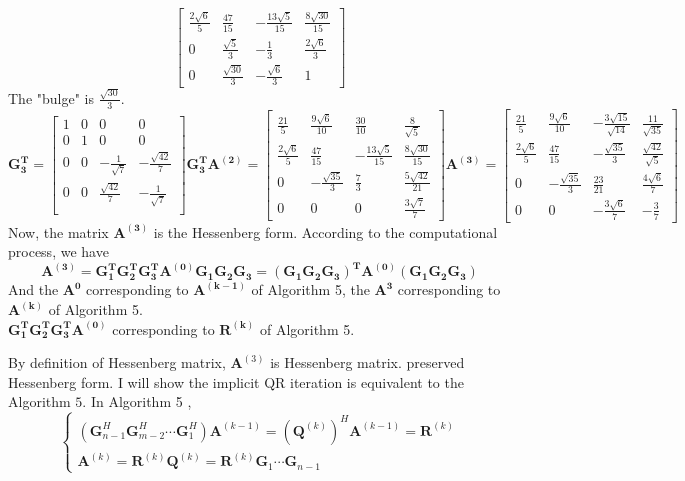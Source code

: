 \documentclass[english,onecolumn]{IEEEtran}
\begin{document}
\begin{enumerate}
$$\begin{bmatrix}
    	\frac{2\sqrt{6}}{5} &\frac{47}{15} &-\frac{13\sqrt{5}}{15} & \frac{8\sqrt{30}}{15}\\
    	0 & \frac{\sqrt{5}}{3} &-\frac{1}{3}&\frac{2\sqrt{6}}{3} \\
    	0 & \frac{\sqrt{30}}{3}& -\frac{\sqrt{6}}{3} & 1
    \end{bmatrix}
    $$
    The "bulge" is $\frac{\sqrt{30}}{3}$.
    $$\mathbf{G_3^T}=\begin{bmatrix}
    	1 & 0 & 0 & 0 \\
    	0& 1 & 0 & 0 \\
    	0 &0 & -\frac{1}{\sqrt{7}} & -\frac{\sqrt{42}}{7} \\
    	0 & 0 & \frac{\sqrt{42}}{7} & -\frac{1}{\sqrt{7}} \\
    \end{bmatrix}
    \mathbf{G_3^TA^{(2)}}=\begin{bmatrix}
    	\frac{21}{5}&\frac{9\sqrt{6}}{10} &\frac{30}{10} &\frac{8}{\sqrt{5}} \\
    	\frac{2\sqrt{6}}{5} & \frac{47}{15} &-\frac{13\sqrt{5}}{15} & \frac{8\sqrt{30}}{15} \\
    	0 & -\frac{\sqrt{35}}{3} & \frac{7}{3} & \frac{5\sqrt{42}}{21}\\
    	0 & 0 & 0 &\frac{3\sqrt{7}}{7}
    \end{bmatrix}
    \mathbf{A^{(3)}}=\begin{bmatrix}
    	\frac{21}{5} & \frac{9\sqrt{6}}{10} & -\frac{3\sqrt{15}}{\sqrt{14}} & \frac{11}{\sqrt{35}}\\
    	\frac{2\sqrt{6}}{5} &\frac{47}{15} &-\frac{\sqrt{35}}{3} & \frac{\sqrt{42}}{\sqrt{5}}\\
    	0 & -\frac{\sqrt{35}}{3} &\frac{23}{21}&\frac{4\sqrt{6}}{7} \\
    	0 & 0 & -\frac{3\sqrt{6}}{7} & -\frac{3}{7}
    \end{bmatrix}
    $$
    Now, the matrix $\mathbf{A^{(3)}}$ is the Hessenberg form.
    According to the computational process, we have 
    $$\mathbf{A^{(3)}}=\mathbf{G_1^TG_2^TG_3^TA^{(0)}G_1G_2G_3}=\mathbf{(G_1G_2G_3)^TA^{(0)}(G_1G_2G_3)}$$
    And the $\mathbf{A^{0}}$ corresponding to  $\mathbf{A^{(k-1)}}$ of  Algorithm 5, the $\mathbf{A^{3}}$ corresponding to
    $\mathbf{A^{(k)}}$ of  Algorithm 5.\\
    $\mathbf{G_1^TG_2^TG_3^TA^{(0)}}$  corresponding to $\mathbf{R^{(k)}}$ of Algorithm 5.
    
    By definition of Hessenberg matrix, $\mathbf{A}^{(3)}$ is Hessenberg matrix. preserved Hessenberg form.
    I will show the implicit QR iteration is equivalent to the Algorithm $5 .$ In Algorithm 5 ,
    $$
    \left\{\begin{array}{l}
    	\left(\mathbf{G}_{n-1}^{H} \mathbf{G}_{m-2}^{H} \cdots \mathbf{G}_{1}^{H}\right) \mathbf{A}^{(k-1)}=\left(\mathbf{Q}^{(k)}\right)^{H} \mathbf{A}^{(k-1)}=\mathbf{R}^{(k)} \\
    	\mathbf{A}^{(k)}=\mathbf{R}^{(k)} \mathbf{Q}^{(k)}=\mathbf{R}^{(k)} \mathbf{G}_{1} \cdots \mathbf{G}_{n-1}
    \end{array}\right.
    $$
    

\end{enumerate}
\end{document}
